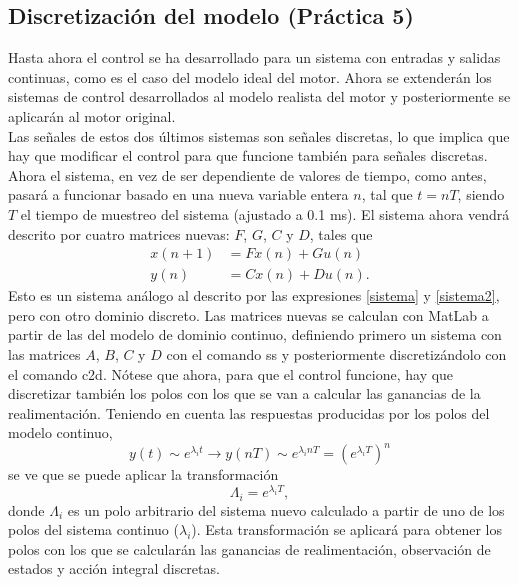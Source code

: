 \documentclass[a4paper, 12pt]{article}
\begin{document}
\subsection{Discretización del modelo (Práctica 5)}
Hasta ahora el control se ha desarrollado para un sistema con entradas y salidas continuas, como es el caso del modelo ideal del motor. Ahora se extenderán los sistemas de control desarrollados al modelo realista del motor y posteriormente se aplicarán al motor original. \\

Las señales de estos dos últimos sistemas son señales discretas, lo que implica que hay que modificar el control para que funcione también para señales discretas. 
Ahora el sistema, en vez de ser dependiente de valores de tiempo, como antes, pasará a funcionar basado en una nueva variable entera $n$, tal que $t = nT$, siendo $T$ el tiempo de muestreo del sistema (ajustado a 0.1 ms). 
El sistema ahora vendrá descrito por cuatro matrices nuevas: $F$, $G$, $C$ y $D$, tales que
\begin{align} \label{zistema}
	x(n + 1) &= Fx(n) + Gu(n) \\
	y(n) &= Cx(n) + Du(n).
\end{align}
\newpage
Esto es un sistema análogo al descrito por las expresiones \ref{sistema} y \ref{sistema2}, pero con otro dominio discreto. 
Las matrices nuevas se calculan con MatLab a partir de las del modelo de dominio continuo, definiendo primero un sistema con las matrices $A$, $B$, $C$ y $D$ con el comando ss y posteriormente discretizándolo con el comando c2d. Nótese que ahora, para que el control funcione, hay que discretizar también los polos con los que se van a calcular las ganancias de la realimentación. 
Teniendo en cuenta las respuestas producidas por los polos del modelo continuo, 
\begin{equation}
	y(t) \sim e^{\lambda_i t} \rightarrow y(nT) \sim e^{\lambda_i nT} = (e^{\lambda_i T})^n
\end{equation}
se ve que se puede aplicar la transformación 
\begin{equation}
	\Lambda_i = e^{\lambda_iT},
\end{equation}
donde $\Lambda_i$ es un polo arbitrario del sistema nuevo calculado a partir de uno de los polos del sistema continuo ($\lambda_i$). Esta transformación se aplicará para obtener los polos con los que se calcularán las ganancias de realimentación, observación de estados y acción integral discretas. \\
\end{document}
